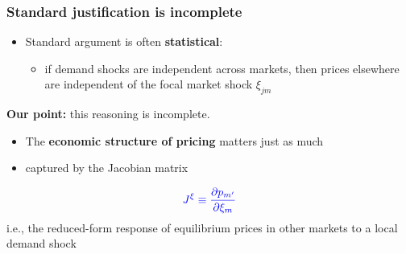 \documentclass[notes,11pt, aspectratio=169]{beamer}
\begin{document}
\begin{frame}
\begin{figure}
{
}
\end{figure}

\end{frame}


\begin{frame}
\frametitle{Standard justification is incomplete}

\begin{itemize}
    \item Standard argument is often \textbf{statistical}:
    \begin{itemize}
        \item if demand shocks are independent across markets, then prices elsewhere are independent of the focal market shock $\xi_{jm}$
    \end{itemize}
\end{itemize}

\vspace{0.3cm}

\textbf{Our point:} this reasoning is incomplete.

\begin{itemize}
    \item The \textbf{economic structure of pricing} matters just as much
    \item captured by the Jacobian matrix
\end{itemize}
\[
\textcolor{blue}{J^{\xi}
\equiv
\frac{\partial p_{m'}}{\partial \xi_m}}
\]
i.e., the reduced-form response of equilibrium prices in other markets to a local demand shock

\end{frame}
\end{document}
